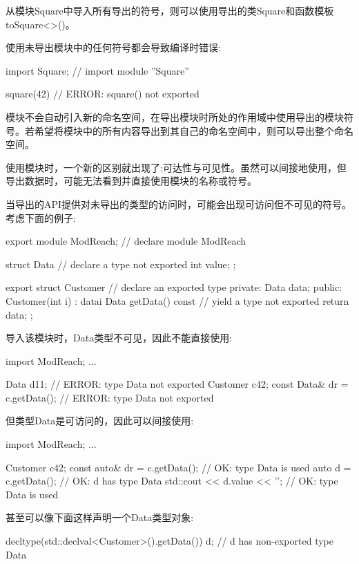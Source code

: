 从模块Square中导入所有导出的符号，则可以使用导出的类Square和函数模板toSquare<>()。

使用未导出模块中的任何符号都会导致编译时错误:

\begin{cpp}
import Square; // import module ”Square”

square(42) // ERROR: square() not exported
\end{cpp}

模块不会自动引入新的命名空间，在导出模块时所处的作用域中使用导出的模块符号。若希望将模块中的所有内容导出到其自己的命名空间中，则可以导出整个命名空间。


使用模块时，一个新的区别就出现了:可达性与可见性。虽然可以间接地使用，但导出数据时，可能无法看到并直接使用模块的名称或符号。

当导出的API提供对未导出的类型的访问时，可能会出现可访问但不可见的符号。考虑下面的例子:

\begin{cpp}
export module ModReach; // declare module ModReach

struct Data { // declare a type not exported
	int value;
};

export struct Customer { // declare an exported type
private:
	Data data;
public:
	Customer(int i)
	: data{i} {
	}
	Data getData() const { // yield a type not exported
		return data;
	}
};
\end{cpp}

导入该模块时，Data类型不可见，因此不能直接使用:

\begin{cpp}
import ModReach;
...

Data d{11}; // ERROR: type Data not exported
Customer c{42};
const Data& dr = c.getData(); // ERROR: type Data not exported
\end{cpp}

但类型Data是可访问的，因此可以间接使用:

\begin{cpp}
import ModReach;
...

Customer c{42};
const auto& dr = c.getData(); // OK: type Data is used
auto d = c.getData(); // OK: d has type Data
std::cout << d.value << '\n'; // OK: type Data is used
\end{cpp}

甚至可以像下面这样声明一个Data类型对象:

\begin{cpp}
decltype(std::declval<Customer>().getData()) d; // d has non-exported type Data
\end{cpp}

